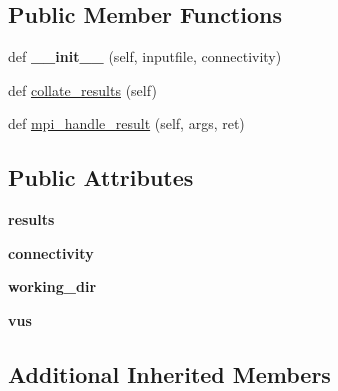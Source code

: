 \subsection*{Public Member Functions}
\begin{DoxyCompactItemize}
\item 
\mbox{\label{classCBGM_1_1check__consistency_1_1CheckConsistency_a3d8ee224f2ab9fd798c357dc8b63274c}} 
def {\bfseries \+\_\+\+\_\+init\+\_\+\+\_\+} (self, inputfile, connectivity)
\item 
def \hyperlink{classCBGM_1_1check__consistency_1_1CheckConsistency_a7f800c25db68d0c3af20fdd478eb749d}{collate\+\_\+results} (self)
\item 
def \hyperlink{classCBGM_1_1check__consistency_1_1CheckConsistency_a7264e4aabf713a19c984a4da92fa42fb}{mpi\+\_\+handle\+\_\+result} (self, args, ret)
\end{DoxyCompactItemize}
\subsection*{Public Attributes}
\begin{DoxyCompactItemize}
\item 
\mbox{\label{classCBGM_1_1check__consistency_1_1CheckConsistency_a08b4e42b36509e0450d17db4373315cb}} 
{\bfseries results}
\item 
\mbox{\label{classCBGM_1_1check__consistency_1_1CheckConsistency_a9431c811d6487d192b80e61101629020}} 
{\bfseries connectivity}
\item 
\mbox{\label{classCBGM_1_1check__consistency_1_1CheckConsistency_acb5baa0394ce9e10063dab362367420c}} 
{\bfseries working\+\_\+dir}
\item 
\mbox{\label{classCBGM_1_1check__consistency_1_1CheckConsistency_a3090b324b6d7b2dc2c079bdfe93e7651}} 
{\bfseries vus}
\end{DoxyCompactItemize}
\subsection*{Additional Inherited Members}


